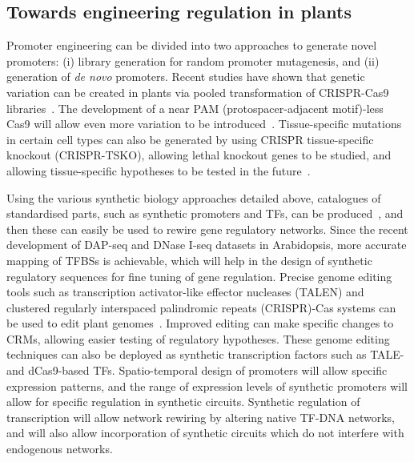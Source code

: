 \documentclass[../main.tex]{subfiles}
\begin{document}
\subsection{Towards engineering regulation in plants}\label{chapter1:towards-engineering-regulation-in-plants}
Promoter engineering can be divided into two approaches to generate novel promoters: (i) library generation for random promoter mutagenesis, and (ii) generation of \textit{de novo} promoters.
Recent studies have shown that genetic variation can be created in plants via pooled transformation of CRISPR-Cas9 libraries~\autocite{jacobsGenerationCollectionMutant2017,luGenomewideTargetedMutagenesis2017,mengConstructionGenomeWideMutant2017,jacobsGenerationCollectionMutant2017,baiGenerationMultiplexMutagenesis2020}.
The development of a near PAM (protospacer\hyp{}adjacent motif)\hyp{}less Cas9 will allow even more variation to be introduced~\autocite{waltonUnconstrainedGenomeTargeting2020}.
Tissue\hyp{}specific mutations in certain cell types can also be generated by using CRISPR tissue-specific knockout (CRISPR-TSKO), allowing lethal knockout genes to be studied, and allowing tissue-specific hypotheses to be tested in the future~\autocite{decaesteckerCRISPRTSKOTechniqueEfficient2019}.

Using the various synthetic biology approaches detailed above, catalogues of standardised parts, such as synthetic promoters and TFs, can be produced~\autocite{patronStandardsPlantSynthetic2015}, and then these can easily be used to rewire gene regulatory networks.
Since the recent development of DAP\hyp{}seq and DNase I\hyp{}seq datasets in Arabidopsis, more accurate mapping of TFBSs is achievable, which will help in the design of synthetic regulatory sequences for fine tuning of gene regulation.
Precise genome editing tools such as transcription activator-like effector nucleases (TALEN) and clustered regularly interspaced palindromic repeats (CRISPR)-Cas systems can be used to edit plant genomes~\autocite{malzahnPlantGenomeEditing2017}.
Improved editing can make specific changes to CRMs, allowing easier testing of regulatory hypotheses.
These genome editing techniques can also be deployed as synthetic transcription factors such as TALE- and dCas9\hyp{}based TFs.
Spatio\hyp{}temporal design of promoters will allow specific expression patterns, and the range of expression levels of synthetic promoters will allow for specific regulation in synthetic circuits.
Synthetic regulation of transcription will allow network rewiring by altering native TF\hyp{}DNA networks, and will also allow incorporation of synthetic circuits which do not interfere with endogenous networks.
\end{document}
